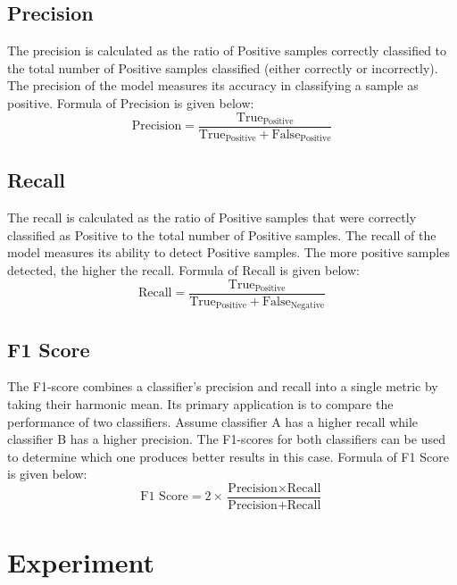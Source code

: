 \documentclass[conference]{IEEEtran}
\begin{document}
\subsection{Precision}
The precision is calculated as the ratio of Positive samples correctly classified to the total number of Positive samples classified (either correctly or incorrectly). The precision of the model measures its accuracy in classifying a sample as positive. Formula of Precision is given below:
\begin{equation*}
    \text{Precision} = \frac{\text{True}_{\text{Positive}}}{\text{True}_{\text{Positive}}+\text{False}_{\text{Positive}}}
\end{equation*}
\subsection{Recall}
The recall is calculated as the ratio of Positive samples that were correctly classified as Positive to the total number of Positive samples. The recall of the model measures its ability to detect Positive samples. The more positive samples detected, the higher the recall. Formula of Recall is given below:
\begin{equation*}
    \text{Recall} = \frac{\text{True}_{\text{Positive}}}{\text{True}_{\text{Positive}}+\text{False}_{\text{Negative}}}
\end{equation*}
\subsection{F1 Score}
The F1-score combines a classifier's precision and recall into a single metric by taking their harmonic mean. Its primary application is to compare the performance of two classifiers. Assume classifier A has a higher recall while classifier B has a higher precision. The F1-scores for both classifiers can be used to determine which one produces better results in this case. Formula of F1 Score is given below:
{\begin{equation*}
    \text{F1 Score} =2 \times \frac{\text{Precision}\times\text{Recall}}{\text{Precision}+\text{Recall}}
\end{equation*}}


\section{Experiment}
\end{document}
